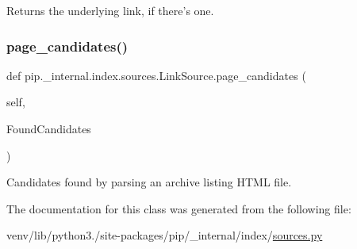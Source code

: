 \begin{DoxyVerb}Returns the underlying link, if there's one.\end{DoxyVerb}
 \mbox{\label{classpip_1_1__internal_1_1index_1_1sources_1_1LinkSource_a82f7eb3c2be528b73c6af132eb846053}} 
\subsubsection{\texorpdfstring{page\+\_\+candidates()}{page\_candidates()}}
{\footnotesize\ttfamily def pip.\+\_\+internal.\+index.\+sources.\+Link\+Source.\+page\+\_\+candidates (\begin{DoxyParamCaption}\item[{}]{self,  }\item[{}]{Found\+Candidates }\end{DoxyParamCaption})}

\begin{DoxyVerb}Candidates found by parsing an archive listing HTML file.\end{DoxyVerb}
 

The documentation for this class was generated from the following file\+:\begin{DoxyCompactItemize}
\item 
venv/lib/python3./site-\/packages/pip/\+\_\+internal/index/\hyperlink{sources_8py}{sources.\+py}\end{DoxyCompactItemize}
